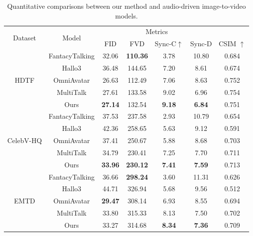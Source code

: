 \begin{table}[t]
        \centering
        \begin{tabular}{c|c|ccccc}
        \toprule
            \multirow{2}{*}{Dataset} & \multirow{2}{*}{Model} & \multicolumn{4}{c}{Metrics} \\
            & & FID & FVD  & Sync-C$\uparrow$ & Sync-D & CSIM $\uparrow$
            \\
            \midrule
            \multirow{5}{*}{HDTF} 
            & FantacyTalking    & 32.06 & \textbf{110.36} & 3.78 & 10.80 & 0.684 \\
            & Hallo3            & 36.48 & 144.65 & 7.20 & 8.61 & 0.674 \\
            & OmniAvatar        & 26.63 & 112.49 & 7.06 & 8.63 & 0.752 \\
            & MultiTalk         & 27.61 & 133.58 & 9.02 & 6.96 & 0.754 \\
            & Ours              & \textbf{27.14} & 132.54 & \textbf{9.18} & \textbf{6.84} & 0.751 \\
            \midrule
            \multirow{5}{*}{CelebV-HQ} 
            & FantacyTalking    & 37.53 & 237.58 & 2.93 & 10.79 & 0.654 \\
            & Hallo3            & 42.36 & 258.65 & 5.63 & 9.12 & 0.591 \\
            & OmniAvatar        & 37.41 & 250.67 & 5.88 & 8.68  & 0.703 \\
            & MultiTalk         & 34.79 & 230.41 & 7.25 & 7.70 & 0.711 \\
            & Ours              & \textbf{33.96} & \textbf{230.12} & \textbf{7.41} & \textbf{7.59} & 0.713 \\
            \midrule
            \multirow{5}{*}{EMTD} 
            & FantacyTalking    & 36.66 & \textbf{298.24} & 3.60 & 11.31 & 0.626 \\
            & Hallo3            & 44.71 & 326.94 & 5.68 & 9.56  & 0.512 \\
            & OmniAvatar        & \textbf{29.47} & 308.14 & 6.93 & 8.55 & 0.694 \\
            & MultiTalk         & 33.80 & 315.33 & 8.13 & 7.50 & 0.702 \\
            & Ours              & 33.27 & 314.68 & \textbf{8.34} & \textbf{7.36} & 0.709 \\
            \bottomrule
        \end{tabular}
        \caption{
        Quantitative comparisons between our method and audio-driven image-to-video models.
        }
        \label{tab:quantitative-i2v}
\end{table}
